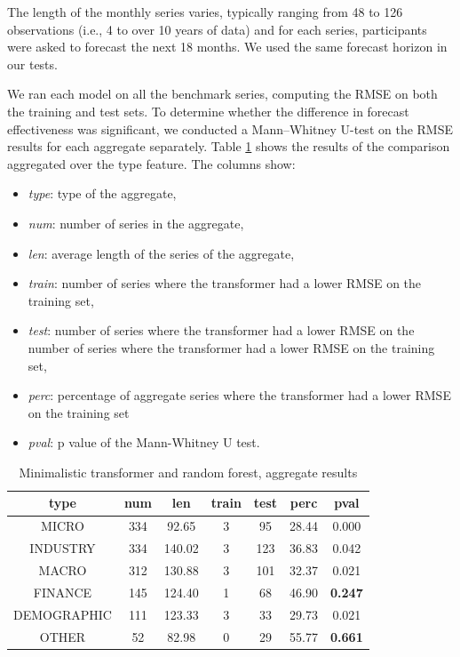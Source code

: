 \documentclass[algorithms,article,submit,pdftex,moreauthors]{Definitions/mdpi}
\begin{document}
The length of the monthly series varies, typically ranging from 48 to 126 observations (i.e., 4 to over 10 years of data) and for each series, participants were asked to forecast the next 18 months. We used the same forecast horizon in our tests.

We ran each model on all the benchmark series, computing the RMSE on both the training and test sets. To determine whether the difference in forecast effectiveness was significant, we conducted a Mann–Whitney U-test on the RMSE results for each aggregate separately. Table \ref{tab:aggregate} shows the results of the comparison aggregated over the type feature. The columns show:
\begin{itemize}
	\item {\it type}: type of the aggregate,
	\item {\it num}: number of series in the aggregate,
	\item {\it len}: average length of the series of the aggregate,
	\item {\it train}: number of series where the transformer had a lower RMSE on the training set,
	\item {\it test}: number of series where the transformer had a lower RMSE on the number of series where the transformer had a lower RMSE on the training set,
	\item {\it perc}: percentage of aggregate series where the transformer had a lower RMSE on the training set
	\item {\it pval}: p value of the Mann-Whitney U test.
\end{itemize}

\begin{table}[H]
\caption{Minimalistic transformer and random forest, aggregate results}
\label{tab:aggregate}
\centering
\begin{tabular}{ccccccc}
\toprule
{\bf type} & {\bf num} & len & {\bf train} & {\bf test} & {\bf perc} & {\bf pval}\\
\midrule
MICRO       & 334 &  92.65 & 3 &  95 & 28.44 & 0.000\\
INDUSTRY    & 334 & 140.02 & 3 & 123 & 36.83 & 0.042\\
MACRO       & 312 & 130.88 & 3 & 101 & 32.37 & 0.021\\
FINANCE     & 145 & 124.40 & 1 &  68 & 46.90 & {\bf 0.247}\\
DEMOGRAPHIC & 111 & 123.33 & 3 &  33 & 29.73 & 0.021\\
OTHER       &  52 &  82.98 & 0 &  29 & 55.77 & {\bf 0.661}\\
\bottomrule
\end{tabular}
\end{table}
\end{document}
